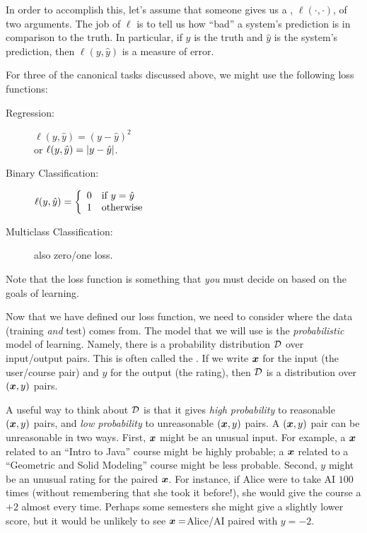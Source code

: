 In order to accomplish this, let's assume that someone gives us a
, $\ell(\cdot,\cdot)$, of two arguments.  The
job of $\ell$ is to tell us how ``bad'' a system's prediction is in
comparison to the truth.  In particular, if $y$ is the truth and $\hat
y$ is the system's prediction, then $\ell(y,\hat y)$ is a measure of
error.

For three of the canonical tasks discussed above, we might use the
following loss functions:

\begin{description}
\item[Regression:]  $\ell(y,\hat y) = (y - \hat
  y)^2$\\ or  $\ell(y,\hat y) = \ab{y - \hat y}$.

\item[Binary Classification:]  $\ell(y,\hat y)
  = \brack{0 & \text{if } y = \hat y\\ 1 & \text{otherwise}}$

\item[Multiclass Classification:] also zero/one loss.
\end{description}


Note that the loss function is something that \emph{you} must decide
on based on the goals of learning.

Now that we have defined our loss function, we need to consider where
the data (training \emph{and} test) comes from.  The model that we
will use is the \emph{probabilistic} model of learning.  Namely, there
is a probability distribution $\cD$ over input/output pairs.  This is
often called the .  If we write
$\vx$ for the input (the user/course pair) and $y$ for the output (the
rating), then $\cD$ is a distribution over $(\vx,y)$ pairs.

A useful way to think about $\cD$ is that it gives \emph{high
  probability} to reasonable $(\vx,y)$ pairs, and \emph{low
  probability} to unreasonable $(\vx,y)$ pairs.  A $(\vx,y)$ pair can
be unreasonable in two ways.  First, $\vx$ might be an unusual input.
For example, a $\vx$ related to an ``Intro to Java'' course might be
highly probable; a $\vx$ related to a ``Geometric and Solid Modeling''
course might be less probable.  Second, $y$ might be an unusual rating
for the paired $\vx$.  For instance, if Alice were to take AI $100$
times (without remembering that she took it before!), she would give
the course a $+2$ almost every time.  Perhaps some semesters she might
give a slightly lower score, but it would be unlikely to see
$\vx=$Alice/AI paired with $y=-2$.

